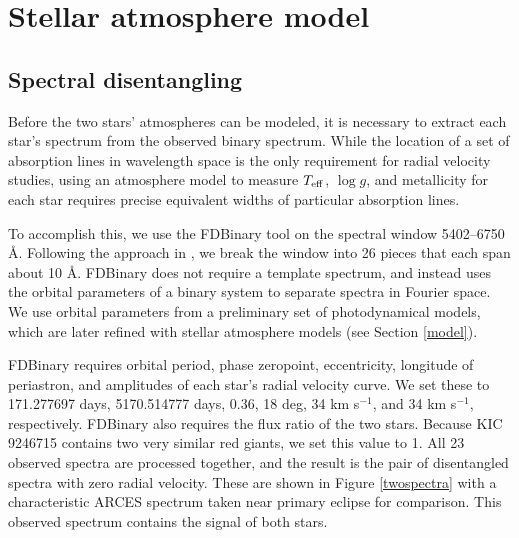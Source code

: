\section{Stellar atmosphere model}\label{atm}

\subsection{Spectral disentangling}\label{disentangle}
Before the two stars' atmospheres can be modeled, it is necessary to extract each star's spectrum from the observed binary spectrum. While the location of a set of absorption lines in wavelength space is the only requirement for radial velocity studies, using an atmosphere model to measure $T_{\rm{eff}}$, $\log g$, and metallicity for each star requires precise equivalent widths of particular absorption lines.

To accomplish this, we use the FDBinary tool \citep{ili04} on the spectral window 5402--6750 \AA. Following the approach in \citet{bec14}, we break the window into 26 pieces that each span about 10 \AA. FDBinary does not require a template spectrum, and instead uses the orbital parameters of a binary system to separate spectra in Fourier space. We use orbital parameters from a preliminary set of photodynamical models, which are later refined with stellar atmosphere models (see Section \ref{model}).

FDBinary requires orbital period, phase zeropoint, eccentricity, longitude of periastron, and amplitudes of each star's radial velocity curve. We set these to 171.277697 days, 5170.514777 days, 0.36, 18 deg, 34 km s$^{-1}$, and 34 km s$^{-1}$, respectively. FDBinary also requires the flux ratio of the two stars. Because KIC 9246715 contains two very similar red giants, we set this value to 1. All 23 observed spectra are processed together, and the result is the pair of disentangled spectra with zero radial velocity. These are shown in Figure \ref{twospectra} with a characteristic ARCES spectrum taken near primary eclipse for comparison. This observed spectrum contains the signal of both stars.
